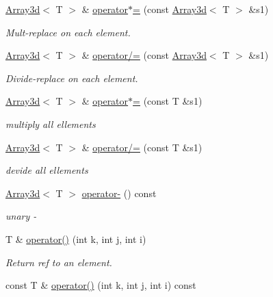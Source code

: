 \begin{DoxyCompactItemize}
\mbox{\hyperlink{classXMLArray_1_1Array3d}{Array3d}}$<$ T $>$ \& \mbox{\hyperlink{classXMLArray_1_1Array3d_a8084893bc2fd7c37f656d6eec21189eb}{operator$\ast$=}} (const \mbox{\hyperlink{classXMLArray_1_1Array3d}{Array3d}}$<$ T $>$ \&s1)
\begin{DoxyCompactList}\small\item\em Mult-\/replace on each element. \end{DoxyCompactList}\item 
\mbox{\hyperlink{classXMLArray_1_1Array3d}{Array3d}}$<$ T $>$ \& \mbox{\hyperlink{classXMLArray_1_1Array3d_a67c611b25c5969b9b340959fde49f602}{operator/=}} (const \mbox{\hyperlink{classXMLArray_1_1Array3d}{Array3d}}$<$ T $>$ \&s1)
\begin{DoxyCompactList}\small\item\em Divide-\/replace on each element. \end{DoxyCompactList}\item 
\mbox{\hyperlink{classXMLArray_1_1Array3d}{Array3d}}$<$ T $>$ \& \mbox{\hyperlink{classXMLArray_1_1Array3d_aff3679dabbd2691243dce85defb9519d}{operator$\ast$=}} (const T \&s1)
\begin{DoxyCompactList}\small\item\em multiply all ellements \end{DoxyCompactList}\item 
\mbox{\hyperlink{classXMLArray_1_1Array3d}{Array3d}}$<$ T $>$ \& \mbox{\hyperlink{classXMLArray_1_1Array3d_a28d7fb90e93469c69a1e0bd563967792}{operator/=}} (const T \&s1)
\begin{DoxyCompactList}\small\item\em devide all ellements \end{DoxyCompactList}\item 
\mbox{\hyperlink{classXMLArray_1_1Array3d}{Array3d}}$<$ T $>$ \mbox{\hyperlink{classXMLArray_1_1Array3d_ae6a356b75bd22316f0d4f94beea360d9}{operator-\/}} () const
\begin{DoxyCompactList}\small\item\em unary -\/ \end{DoxyCompactList}\item 
T \& \mbox{\hyperlink{classXMLArray_1_1Array3d_a2c17e47922ca191dbce50300c6dd6785}{operator()}} (int k, int j, int i)
\begin{DoxyCompactList}\small\item\em Return ref to an element. \end{DoxyCompactList}\item 
const T \& \mbox{\hyperlink{classXMLArray_1_1Array3d_a177102edcf9ac47e8dbf50311d9e5549}{operator()}} (int k, int j, int i) const

\end{DoxyCompactItemize}
